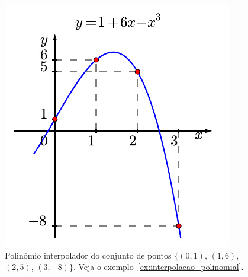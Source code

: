 \begin{figure}[ht]
  \centering
  \includegraphics{./cap_interp/pics/ex_interpolacao_polinomial/ex_interpolacao_polinomial}
  \caption{Polinômio interpolador do conjunto de pontos $\{(0, 1)$, $(1, 6)$, $(2, 5)$, $(3, -8)\}$. Veja o exemplo~\ref{ex:interpolacao_polinomial}.}\label{fig:ex_interpolacao_polinomial}
\end{figure}

